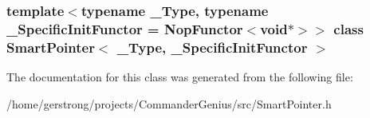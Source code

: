 \subsubsection*{template$<$typename \_\-Type, typename \_\-SpecificInitFunctor = NopFunctor$<$void$\ast$$>$$>$ class SmartPointer$<$ \_\-Type, \_\-SpecificInitFunctor $>$}



The documentation for this class was generated from the following file:\begin{DoxyCompactItemize}
\item 
/home/gerstrong/projects/CommanderGenius/src/SmartPointer.h\end{DoxyCompactItemize}
